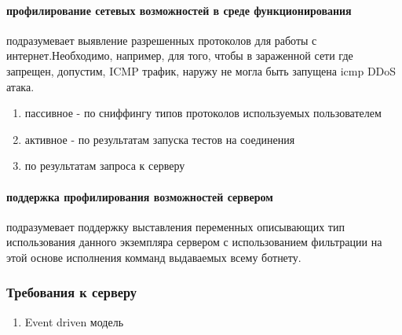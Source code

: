 \paragraph{профилирование сетевых возможностей в среде функционирования} подразумевает выявление
разрешенных протоколов для работы с интернет.Необходимо, например, для того, чтобы в зараженной сети где запрещен, допустим, ICMP трафик, наружу не могла быть запущена icmp DDoS атака.
\begin{enumerate}
\item{пассивное - по сниффингу типов протоколов используемых пользователем}
\item{активное - по результатам запуска тестов на соединения}
\item{по результатам запроса к серверу}
\end{enumerate}

\paragraph{поддержка профилирования возможностей сервером}
подразумевает поддержку выставления переменных описывающих тип использования данного экземпляра сервером с использованием фильтрации на этой основе исполнения комманд выдаваемых всему ботнету.


\subsubsection{Требования к серверу}

\begin{enumerate}
\item{Event driven модель}
\end{enumerate}

